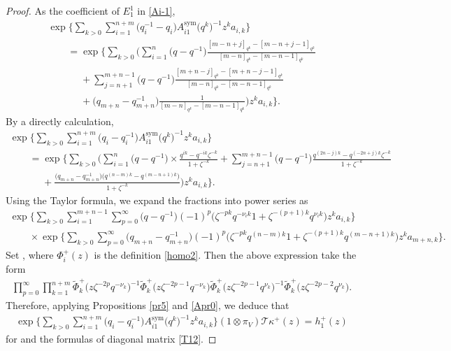 \documentclass[10pt,a4paper]{amsart}
\numberwithin{equation}{section}
\begin{document}
\begin{proof}
As the coefficient of $E^1_1$ in \eqref{Ai-1},
\begin{gather*}
 \exp\Biggl\{\sum\limits_{k>0}\sum\limits_{i=1}^{n+m}\bigl(q_i^{-1}-q_i\bigr)
 A_{i1}^{\operatorname{sym}}\bigl(q^k\bigr)^{-1} z^k
 a_{i,k}\Biggr\}\\
 \qquad=\exp\Biggl\{\sum\limits_{k>0}\Biggl(\sum\limits_{i=1}^{n}\bigl(q-q^{-1}\bigr)
 \frac{[m-n+j]_{q^k}-[m-n+j-1]_{q^k}}{[m-n]_{q^k}-[m-n-1]_{q^k}}\\
 \phantom{\qquad=}{}+\sum\limits_{j=n+1}^{m+n-1}\bigl(q-q^{-1}\bigr)
 \frac{[m+n-j]_{q^k}-[m+n-j-1]_{q^k}}{[m-n]_{q^k}-[m-n-1]_{q^k}}\\
 \phantom{\qquad=}{} +\bigl(q_{m+n}-q_{m+n}^{-1}\bigr)\frac{1}{[m-n]_{q^k}-[m-n-1]_{q^k}}
 \biggr) z^k
 a_{i,k}\biggr\}.
\end{gather*}
By a directly calculation,
\begin{gather*}
 \exp\Biggl\{\sum\limits_{k>0}\sum\limits_{i=1}^{n+m}\bigl(q_i-q_i^{-1}\bigr)
 A_{i1}^{\operatorname{sym}}\bigl(q^k\bigr)^{-1} z^k
 a_{i,k}\Biggr\}\\
 \qquad=\exp\Biggl\{\sum\limits_{k>0}\Biggl(\sum\limits_{i=1}^{n}\bigl(q-q^{-1}\bigr)\times
 \frac{q^{ik}-q^{-ik}\zeta^{-k}}{1+\zeta^{-k}}+
 \sum\limits_{j=n+1}^{m+n-1}\bigl(q-q^{-1}\bigr)
 \frac{q^{(2n-j)k}-q^{(-2n+j)k}\zeta^{-k}}{1+\zeta^{-k}}\\
 \phantom{\qquad=}{} +
 \frac{\bigl(q_{m+n}-q_{m+n}^{-1}\bigr)\bigl(q^{(n-m)k}-q^{(m-n+1)k}\bigr)}{1+\zeta^{-k}}
 \biggr) z^k
 a_{i,k}\biggr\}.
\end{gather*}
Using the Taylor formula, we expand the fractions into power series as
\begin{gather*}
 \exp\Biggl\{\sum\limits_{k>0}\sum\limits_{i=1}^{m+n-1}\sum\limits_{p=0}^{\infty}\bigl(q-q^{-1}\bigr)(-1)^p
 \bigl(\zeta^{-pk}q^{-\nu_ik}1+\zeta^{-(p+1)k}q^{\nu_ik}\bigr)z^k
 a_{i,k}\Biggr\}\\
 \qquad \times\exp\Biggl\{\sum\limits_{k>0}\sum\limits_{p=0}^{\infty}\bigl(q_{m+n}-q_{m+n}^{-1}\bigr)(-1)^p
 \bigl(\zeta^{-pk}q^{(n-m)k}1+\zeta^{-(p+1)k}q^{(m-n+1)k}\bigr)z^k
 a_{m+n,k}\Biggr\}.
\end{gather*}
 Set , where $\Phi^+_i(z)$ is the definition \eqref{homo2}. Then the above expression take the form
\begin{gather*}
 \prod\limits_{p=0}^{\infty}\prod\limits_{k=1}^{n+m}\widetilde{\Phi}^{+}_{k}\bigl(z\zeta^{-2p} q^{-\nu_k}\bigr)^{-1}\widetilde{\Phi}^{+}_{k}\bigl(z\zeta^{-2p-1} q^{-\nu_k}\bigr)\widetilde{\Phi}^{+}_{k}\bigl(z\zeta^{-2p-1} q^{\nu_k}\bigr)^{-1}\widetilde{\Phi}^{+}_{k}\bigl(z\zeta^{-2p-2} q^{\nu_k}\bigr)
.
\end{gather*}
Therefore, applying Propositions \ref{pr5} and \ref{Apr0}, we deduce that
\begin{gather*}
 \exp\Biggl\{\sum\limits_{k>0}\sum\limits_{i=1}^{n+m}\bigl(q_i-q_i^{-1}\bigr)
 A_{i1}^{\operatorname{sym}}\bigl(q^k\bigr)^{-1} z^k
 a_{i,k}\Biggr\}(1\otimes\pi_V)\mathcal{T}\kappa^{+}(z)=h_1^{+}(z)
\end{gather*}
for  and
the formulas of diagonal matrix
\eqref{T12}.


\end{proof}
\end{document}
